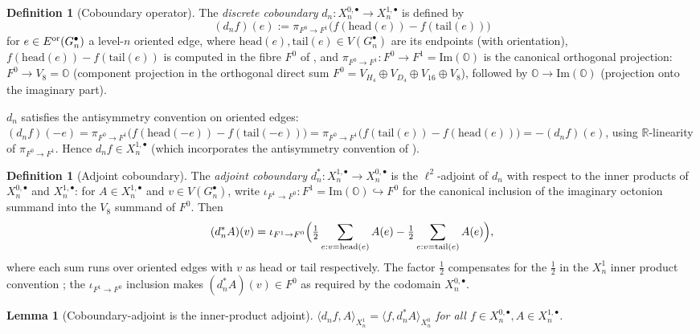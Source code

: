 \documentclass[11pt, a4paper]{amsart}
\newtheorem{lemma}[theorem]{Lemma}
\theoremstyle{definition}
\newtheorem{definition}[theorem]{Definition}
\newcommand{\R}{\mathbb{R}}
\newcommand{\OO}{\mathbb{O}}
\renewcommand{\Im}{\mathrm{Im}}
\begin{document}
\begin{definition}[Coboundary operator]
\label{def:coboundary}
The \emph{discrete coboundary}
$d_n \colon X_n^{0, \bullet} \to X_n^{1, \bullet}$ is defined by
\[
  (d_n f)(e) := \pi_{F^0 \to F^1}\bigl(
    f(\text{head}(e)) - f(\text{tail}(e))\bigr)
\]
for $e \in E^{\rm or}(G_n^\bullet)$ a level-$n$ oriented edge,
where $\text{head}(e), \text{tail}(e) \in V(G_n^\bullet)$ are its
endpoints (with orientation), $f(\text{head}(e)) -
f(\text{tail}(e))$ is computed in the fibre $F^0$ of
\cite[Notation~\texttt{not:fibres}]{RefinementSpaces}, and
$\pi_{F^0 \to F^1} \colon F^0 \to F^1 = \Im(\OO)$ is the
canonical orthogonal projection: $F^0 \to V_8 = \OO$ (component
projection in the orthogonal direct sum
$F^0 = V_{H_4} \oplus V_{D_4} \oplus V_{16} \oplus V_8$),
followed by $\OO \to \Im(\OO)$ (projection onto the imaginary
part).

$d_n$ satisfies the antisymmetry convention on oriented edges:
$(d_n f)(-e) = \pi_{F^0 \to F^1}\bigl(
f(\text{head}(-e)) - f(\text{tail}(-e))\bigr) =
\pi_{F^0 \to F^1}\bigl(f(\text{tail}(e)) - f(\text{head}(e))
\bigr) = -(d_n f)(e)$, using $\R$-linearity of $\pi_{F^0 \to F^1}$.
Hence $d_n f \in X_n^{1, \bullet}$ (which incorporates the
antisymmetry convention of
\cite[Definition~\texttt{def:Xn-1}]{RefinementSpaces}).
\end{definition}

\begin{definition}[Adjoint coboundary]
\label{def:coboundary-adjoint}
The \emph{adjoint coboundary} $d_n^* \colon X_n^{1, \bullet} \to
X_n^{0, \bullet}$ is the $\ell^2$-adjoint of $d_n$ with respect
to the inner products of $X_n^{0, \bullet}$ and $X_n^{1, \bullet}$:
for $A \in X_n^{1, \bullet}$ and $v \in V(G_n^\bullet)$, write
$\iota_{F^1 \to F^0} \colon F^1 = \Im(\OO) \hookrightarrow F^0$
for the canonical inclusion of the imaginary octonion summand
into the $V_8$ summand of $F^0$. Then
\[
  (d_n^* A)(v) = \iota_{F^1 \to F^0}\Bigl(
    \tfrac{1}{2} \sum_{e : v = \text{head}(e)}
      A(e) - \tfrac{1}{2} \sum_{e : v = \text{tail}(e)} A(e)\Bigr),
\]
where each sum runs over oriented edges with $v$ as head or tail
respectively. The factor $\tfrac{1}{2}$ compensates for the
$\tfrac{1}{2}$ in the $X_n^1$ inner product convention
\cite[Definition~\texttt{def:Xn-1}]{RefinementSpaces}; the
$\iota_{F^1 \to F^0}$ inclusion makes $(d_n^* A)(v) \in F^0$ as
required by the codomain $X_n^{0, \bullet}$.
\end{definition}

\begin{lemma}[Coboundary-adjoint is the inner-product adjoint]
\label{lem:dn-adjoint}
$\langle d_n f, A \rangle_{X_n^1} = \langle f, d_n^* A
\rangle_{X_n^0}$ for all $f \in X_n^{0, \bullet}, A \in
X_n^{1, \bullet}$.
\end{lemma}
\end{document}
